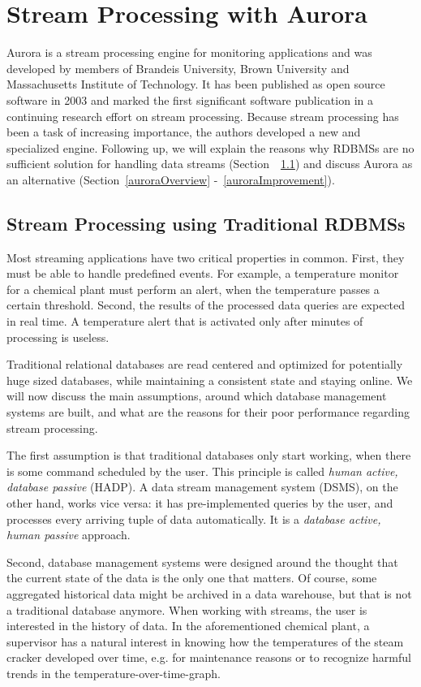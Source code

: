 \section{Stream Processing with Aurora}\label{aurora}
Aurora is a stream processing engine for monitoring applications and was developed by members of Brandeis University, Brown University and Massachusetts Institute of Technology. It has been published as open source software in 2003 and marked the first significant software publication in a continuing research effort on stream processing. Because stream processing has been a task of increasing importance, the authors developed a new and specialized engine. Following up, we will explain the reasons why RDBMSs are no sufficient solution for handling data streams (Section~~\ref{streamRDBMSProblems}) and discuss Aurora as an alternative (Section~\ref{auroraOverview} -~\ref{auroraImprovement}).

\subsection{Stream Processing using Traditional RDBMSs}\label{streamRDBMSProblems}
Most streaming applications have two critical properties in common. First, they must be able to handle predefined events. For example, a temperature monitor for a chemical plant must perform an alert, when the temperature passes a certain threshold. Second, the results of the processed data queries are expected in real time. A temperature alert that is activated only after minutes of processing is useless.

Traditional relational databases are read centered and optimized for potentially huge sized databases, while maintaining a consistent state and staying online. We will now discuss the main assumptions, around which database management systems are built, and what are the reasons for their poor performance regarding stream processing.

The first assumption is that traditional databases only start working, when there is some command scheduled by the user. This principle is called \textit{human active, database passive} (HADP). A data stream management system (DSMS), on the other hand, works vice versa: it has pre-implemented queries by the user, and processes every arriving tuple of data automatically. It is a \textit{database active, human passive} approach.

Second, database management systems were designed around the thought that the current state of the data is the only one that matters. Of course, some aggregated historical data might be archived in a data warehouse, but that is not a traditional database anymore. When working with streams, the user is interested in the history of data. In the aforementioned chemical plant, a supervisor has a natural interest in knowing how the temperatures of the steam cracker developed over time, e.g. for maintenance reasons or to recognize harmful trends in the temperature-over-time-graph.

